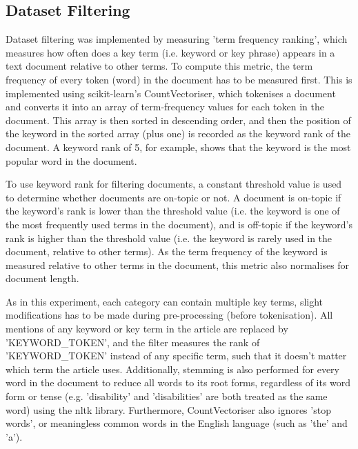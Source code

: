 \documentclass{report}
\begin{document}
\subsection{Dataset Filtering} \label{des-filtering}

Dataset filtering was implemented by measuring 'term frequency ranking', which measures how often does a key term (i.e. keyword or key phrase) appears in a text document relative to other terms.
To compute this metric, the term frequency of every token (word) in the document has to be measured first.
This is implemented using scikit-learn's \cite{Scikit-learn} CountVectoriser, which tokenises a document and converts it into an array of term-frequency values for each token in the document.
This array is then sorted in descending order, and then the position of the keyword in the sorted array (plus one) is recorded as the keyword rank of the document.
A keyword rank of 5, for example, shows that the keyword is the  most popular word in the document.

To use keyword rank for filtering documents, a constant threshold value is used to determine whether documents are on-topic or not.
A document is on-topic if the keyword's rank is lower than the threshold value (i.e. the keyword is one of the most frequently used terms in the document), and is off-topic if the keyword's rank is higher than the threshold value (i.e. the keyword is rarely used in the document, relative to other terms).
As the term frequency of the keyword is measured relative to other terms in the document, this metric also normalises for document length.

As in this experiment, each category can contain multiple key terms, slight modifications has to be made during pre-processing (before tokenisation).
All mentions of any keyword or key term in the article are replaced by 'KEYWORD\_TOKEN', and the filter measures the rank of 'KEYWORD\_TOKEN' instead of any specific term, such that it doesn't matter which term the article uses.
Additionally, stemming is also performed for every word in the document to reduce all words to its root forms, regardless of its word form or tense (e.g. 'disability' and 'disabilities' are both treated as the same word) using the nltk \cite{Nltk} library.
Furthermore, CountVectoriser also ignores 'stop words', or meaningless common words in the English language (such as 'the' and 'a').
\end{document}
